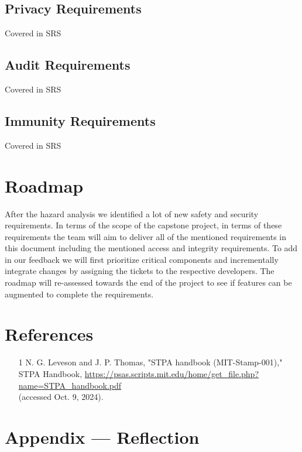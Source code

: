 \documentclass{article}
\begin{document}
\subsection{Privacy Requirements}
Covered in SRS

\subsection{Audit Requirements}
Covered in SRS

\subsection{Immunity Requirements}
Covered in SRS

\section{Roadmap}


After the hazard analysis we identified a lot of new safety and security requirements. In terms of the scope of the capstone project, in terms of these requirements the team will aim to deliver all of the mentioned requirements in this document including the mentioned access and integrity requirements. To add in our feedback we will first prioritize critical components and incrementally integrate changes by assigning the tickets to the respective developers. The roadmap will re-assessed towards the end of the project to see if features can be augmented to complete the requirements.


\newpage{}

\section{References}

\begin{itemize}
    \item [1] N. G. Leveson and J. P. Thomas, "STPA handbook (MIT-Stamp-001)," STPA Handbook,
    \url{https://psas.scripts.mit.edu/home/get_file.php?name=STPA_handbook.pdf} \\ 
    (accessed Oct. 9, 2024).
\end{itemize}

\newpage{}

\section*{Appendix --- Reflection}
\end{document}
